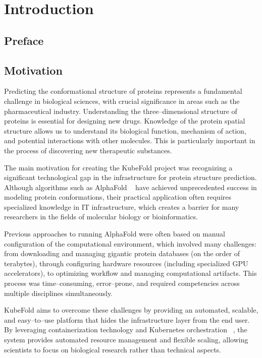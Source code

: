 

\chapter{Introduction}


\section{Preface}


\section{Motivation}

Predicting the conformational structure of proteins represents a fundamental challenge in biological sciences, with crucial significance in areas such as the pharmaceutical industry.
Understanding the three--dimensional structure of proteins is essential for designing new drugs.
Knowledge of the protein spatial structure allows us to understand its biological function, mechanism of action, and potential interactions with other molecules.
This is particularly important in the process of discovering new therapeutic substances.

The main motivation for creating the KubeFold project was recognizing a significant technological gap in the infrastructure for protein structure prediction.
Although algorithms such as AlphaFold ~\cite{alphafold3} have achieved unprecedented success in modeling protein conformations, their practical application often requires specialized knowledge in IT infrastructure, which creates a barrier for many researchers in the fields of molecular biology or bioinformatics.

Previous approaches to running AlphaFold were often based on manual configuration of the computational environment, which involved many challenges: from downloading and managing gigantic protein databases (on the order of terabytes), through configuring hardware resources (including specialized GPU accelerators), to optimizing workflow and managing computational artifacts.
This process was time--consuming, error--prone, and required competencies across multiple disciplines simultaneously.

KubeFold aims to overcome these challenges by providing an automated, scalable, and easy--to--use platform that hides the infrastructure layer from the end user.
By leveraging containerization technology and Kubernetes orchestration ~\cite{kubernetes, container_orchestration}, the system provides automated resource management and flexible scaling, allowing scientists to focus on biological research rather than technical aspects.


